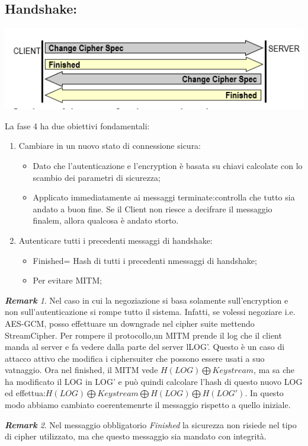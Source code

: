 \documentclass{book}
\theoremstyle{remark}
\newtheorem*{remark}{\textbf{Remark}}
\begin{document}
\subsection{Handshake:}
\begin{center}
	\includegraphics[scale=0.6]{2021-12-08-17-05-47.png}
\end{center}
La fase 4 ha due obiettivi fondamentali:\begin{enumerate}
	\item Cambiare in un nuovo stato di connessione sicura:\begin{itemize}
		      \item Dato che l'autenticazione e l'encryption è basata su chiavi calcolate con lo scambio dei parametri di sicurezza;\@
		      \item Applicato immediatamente ai messaggi terminate:\@inizialmente controlla che tutto sia andato a buon fine\@. Se il Client non riesce a decifrare il messaggio finalem, allora qualcosa è andato storto\@.
	      \end{itemize}
	\item Autenticare tutti i precedenti messaggi di handshake:\begin{itemize}
		      \item Finished= Hash di tutti i precedenti nmessaggi di handshake;\@
		      \item Per evitare MITM\@;\@
	      \end{itemize}
\end{enumerate}
\begin{remark}
	Nel caso in cui la negoziazione si basa solamente sull'encryption e non sull'autenticazione si rompe tutto il sistema\@. Infatti, se volessi negoziare i\@.e\@. AES-GCM, posso effettuare un downgrade nel cipher suite mettendo StreamCipher\@. Per rompere il protocollo,un MITM prende il log che il client manda al server e fa vedere dalla parte del server lLOG'\@. Questo è un caso di attacco attivo che modifica i ciphersuiter che possono essere usati a suo vatnaggio\@. Ora nel finished, il MITM vede \(H(LOG)\bigoplus Keystream\), ma sa che ha modificato il LOG in LOG' e può quindi calcolare l'hash di questo nuovo LOG ed effettua:\(H(LOG)\bigoplus Keystream \bigoplus H(LOG)\bigoplus H(LOG')\)\@.\newline
	In questo modo abbiamo cambiato coerentemenrte il messaggio rispetto a quello iniziale\@.
\end{remark}
\begin{remark}
	Nel messaggio obbligatorio \emph{Finished} la sicurezza non risiede nel tipo di cipher utilizzato, ma che questo messaggio sia mandato con integrità\@.
\end{remark}
\end{document}

